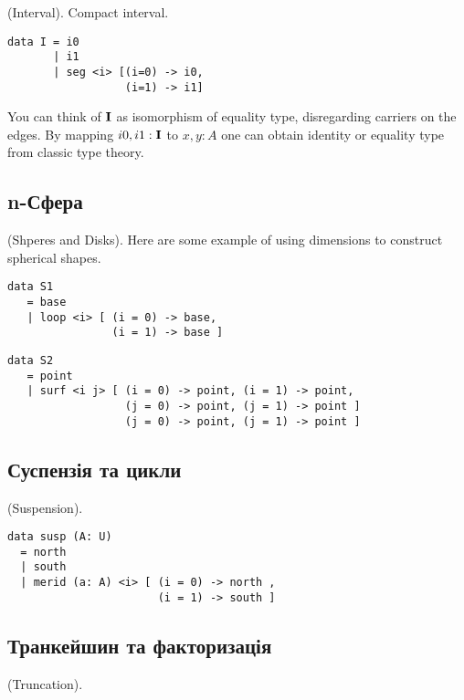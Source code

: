 \begin{definition} (Interval). Compact interval.
\begin{lstlisting}
data I = i0
       | i1
       | seg <i> [(i=0) -> i0,
                  (i=1) -> i1]
\end{lstlisting}
\end{definition}

You can think of ${\bf I}$ as isomorphism of equality type,
disregarding carriers on the edges. By mapping $i0,i1:{\bf I}$ to $x,y:A$ one can
obtain identity or equality type from classic type theory.

\subsection{n-Сфера}

\begin{definition} (Shperes and Disks).
Here are some example of using dimensions to construct spherical shapes.
\begin{lstlisting}
data S1
   = base
   | loop <i> [ (i = 0) -> base,
                (i = 1) -> base ]
\end{lstlisting}
\begin{lstlisting}
data S2
   = point
   | surf <i j> [ (i = 0) -> point, (i = 1) -> point,
                  (j = 0) -> point, (j = 1) -> point ]
                  (j = 0) -> point, (j = 1) -> point ]
\end{lstlisting}
\end{definition}

\subsection{Суспензія та цикли}

\begin{definition} (Suspension).
\begin{lstlisting}
data susp (A: U)
  = north
  | south
  | merid (a: A) <i> [ (i = 0) -> north ,
                       (i = 1) -> south ]
\end{lstlisting}
\end{definition}


\subsection{Транкейшин та факторизація}

\begin{definition} (Truncation).
\end{definition}

